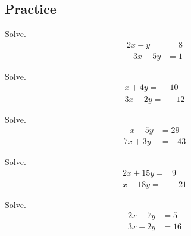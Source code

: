 \subsection{Practice}

\begin{exercise}

Solve. \[
\begin{aligned}
    2x-y   & =8 \\
    -3x-5y & =1
\end{aligned}
\]

\end{exercise}
\vspace*{6\baselineskip}

\begin{exercise}

Solve. \[
\begin{aligned}
    x+4y=  & 10  \\
    3x-2y= & -12
\end{aligned}
\]

\end{exercise}
\vspace*{6\baselineskip}

\begin{exercise}

Solve. \[
\begin{aligned}
    -x-5y & =29  \\
    7x+3y & =-43
\end{aligned}
\]

\end{exercise}
\vspace*{6\baselineskip}

\begin{exercise}

Solve. \[
\begin{aligned}
    2x+15y= & 9   \\
    x-18y=  & -21
\end{aligned}
\]

\end{exercise}
\vspace*{6\baselineskip}

\begin{exercise}

Solve. \[
\begin{aligned}
    2x+7y & =5  \\
    3x+2y & =16
\end{aligned}
\]

\end{exercise}
\vspace*{6\baselineskip}

